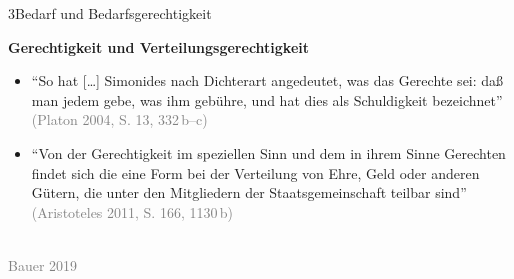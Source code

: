 \documentclass[xcolor=table,9pt,aspectratio=169]{beamer}
\begin{document}
\begin{frame}{\vspace*{10mm}3\hspace*{1em}Bedarf und Bedarfsgerechtigkeit}
\begin{multicols}{2}
   \textbf{Gerechtigkeit und Verteilungsgerechtigkeit}\\
   \medskip
   \begin{itemize}
      \item \enquote{So hat [\ldots] Simonides nach Dichterart angedeutet, was das Gerechte sei: daß man jedem gebe, was ihm gebühre, und hat dies als Schuldigkeit bezeichnet} \textcolor{gray}{(Platon 2004, S. 13, 332\,b--c)}
      \item \enquote{Von der Gerechtigkeit im speziellen Sinn und dem in ihrem Sinne Gerechten findet sich die eine Form bei der Verteilung von Ehre, Geld oder anderen Gütern, die unter den Mitgliedern der Staatsgemeinschaft teilbar sind} \textcolor{gray}{(Aristoteles 2011, S. 166, 1130\,b)}
   \end{itemize}
   \vfill
   \begin{center}
      \\
      \textcolor{gray}{Bauer 2019}
   \end{center}
\end{multicols}
\end{frame}
\end{document}
